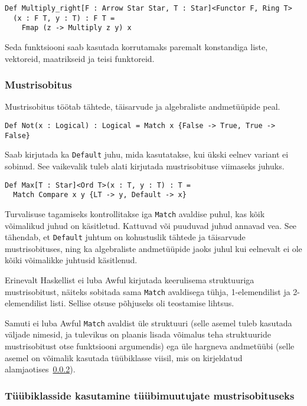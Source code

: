 \documentclass[12pt]{article}
\begin{document}
        \begin{verbatim}Def Multiply_right[F : Arrow Star Star, T : Star]<Functor F, Ring T>
  (x : F T, y : T) : F T =
    Fmap (z -> Multiply z y) x\end{verbatim}

        Seda funktsiooni saab kasutada korrutamaks paremalt konstandiga liste, vektoreid, maatrikseid ja teisi funktoreid.
      \subsubsection{Mustrisobitus}\label{match}
        Mustrisobitus töötab tähtede, täisarvude ja algebraliste andmetüüpide peal.

        \begin{verbatim}Def Not(x : Logical) : Logical = Match x {False -> True, True -> False}\end{verbatim}

        Saab kirjutada ka \verb!Default! juhu, mida kasutatakse, kui ükski eelnev variant ei sobinud. See vaikevalik tuleb alati kirjutada mustrisobituse viimaseks juhuks.

        \begin{verbatim}Def Max[T : Star]<Ord T>(x : T, y : T) : T =
  Match Compare x y {LT -> y, Default -> x}\end{verbatim}

        Turvalisuse tagamiseks kontrollitakse iga \verb!Match! avaldise puhul, kas kõik võimalikud juhud on käsitletud. Kattuvad või puuduvad juhud annavad vea. See tähendab, et \verb!Default! juhtum on kohustuslik tähtede ja täisarvude mustrisobituses, ning ka algebraliste andmetüüpide jaoks juhul kui eelnevalt ei ole kõiki võimalikke juhtusid käsitlenud.

        Erinevalt Haskellist ei luba Awful kirjutada keerulisema struktuuriga mustrisobitust, näiteks sobitada sama \verb!Match! avaldisega tühja, 1-elemendilist ja 2-elemendilist listi. Sellise otsuse põhjuseks oli teostamise lihtsus.

        Samuti ei luba Awful \verb!Match! avaldist üle struktuuri (selle asemel tuleb kasutada väljade nimesid, ja tulevikus on plaanis lisada võimalus teha struktuuride mustrisobitust otse funktsiooni argumendis) ega üle hargneva andmetüübi (selle asemel on võimalik kasutada tüübiklasse viisil, mis on kirjeldatud alamjaotises~\ref{tyybiklassihakk}).
      \subsubsection{Tüübiklasside kasutamine tüübimuutujate mustrisobituseks}\label{tyybiklassihakk}
        
\end{document}
